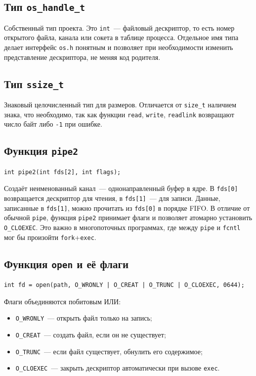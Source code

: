 \documentclass[11pt, a4paper]{article}
\begin{document}
\subsection{Тип \texttt{os\_handle\_t}}

Собственный тип проекта. Это \texttt{int}~--- файловый дескриптор, то есть
номер открытого файла, канала или сокета в таблице процесса. Отдельное имя
типа делает интерфейс \texttt{os.h} понятным и позволяет при необходимости
изменить представление дескриптора, не меняя код родителя.

\subsection{Тип \texttt{ssize\_t}}

Знаковый целочисленный тип для размеров. Отличается от \texttt{size\_\allowbreak{}t} наличием
знака, что необходимо, так как функции \texttt{read}, \texttt{write},
\texttt{readlink} возвращают число байт либо \texttt{-1} при ошибке.

\subsection{Функция \texttt{pipe2}}

\begin{lstlisting}
int pipe2(int fds[2], int flags);
\end{lstlisting}

Создаёт неименованный канал~--- однонаправленный буфер в ядре. В \texttt{fds[0]}
возвращается дескриптор для чтения, в \texttt{fds[1]}~--- для записи. Данные,
записанные в \texttt{fds[1]}, можно прочитать из \texttt{fds[0]} в порядке FIFO.
В отличие от обычной \texttt{pipe}, функция \texttt{pipe2} принимает флаги и
позволяет атомарно установить \texttt{O\_\allowbreak{}CLOEXEC}. Это важно в многопоточных
программах, где между \texttt{pipe} и \texttt{fcntl} мог бы произойти
\texttt{fork}+\texttt{exec}.

\subsection{Функция \texttt{open} и её флаги}

\begin{lstlisting}
int fd = open(path, O_WRONLY | O_CREAT | O_TRUNC | O_CLOEXEC, 0644);
\end{lstlisting}

Флаги объединяются побитовым ИЛИ:

\begin{itemize}[noitemsep]
  \item \texttt{O\_\allowbreak{}WRONLY}~--- открыть файл только на запись;
  \item \texttt{O\_\allowbreak{}CREAT}~--- создать файл, если он не существует;
  \item \texttt{O\_\allowbreak{}TRUNC}~--- если файл существует, обнулить его содержимое;
  \item \texttt{O\_\allowbreak{}CLOEXEC}~--- закрыть дескриптор автоматически при вызове \texttt{exec}.
\end{itemize}
\end{document}
